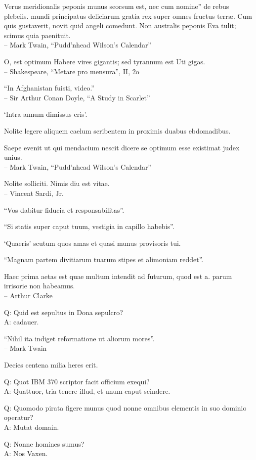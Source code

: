 \documentclass[titlepage,12pt]{memoir}
\begin{document}
Verus meridionalis peponis munus seorsum est, nec cum nomine”
de rebus plebeiis. mundi principatus deliciarum gratia rex
super omnes fructus terræ. Cum quis gustaverit, novit quid
angeli comedunt. Non australis peponis Eva tulit; scimus quia
paenituit.
\\-- Mark Twain, “Pudd’nhead Wilson’s Calendar”

O, est optimum
Habere vires gigantis; sed tyrannum est
Uti gigas.
\\-- Shakespeare, “Metare pro mensura”, II, 2o

 “In Afghanistan fuisti, video.”
\\-- Sir Arthur Conan Doyle, “A Study in Scarlet”

‘Intra annum dimissus eris’.

Nolite legere aliquem caelum scribentem in proximis duabus ebdomadibus.

Saepe evenit ut qui mendacium nescit dicere se optimum esse existimat
judex unius.
\\-- Mark Twain, “Pudd’nhead Wilson’s Calendar”

Nolite solliciti. Nimis diu est vitae.
\\-- Vincent Sardi, Jr.

“Vos dabitur fiducia et responsabilitas”.

“Si statis super caput tuum, vestigia in capillo habebis”.

‘Quaeris’ scutum quos amas et quasi munus provisoris tui.

“Magnam partem divitiarum tuarum stipes et alimoniam reddet”.

Haec prima aetas est quae multum intendit ad futurum, quod est a.
parum irrisorie non habeamus.
\\-- Arthur Clarke

Q: Quid est sepultus in Dona sepulcro?\\
A: cadauer.

“Nihil ita indiget reformatione ut aliorum mores”.
\\-- Mark Twain

Decies centena milia heres erit.

Q: Quot IBM 370 scriptor facit officium exequi?\\
A: Quattuor, tria tenere illud, et unum caput scindere.

Q: Quomodo pirata figere munus quod
nonne omnibus elementis in suo dominio operatur?\\
A: Mutat domain.

Q: Nonne homines sumus?\\
A: Nos Vaxen.
\end{document}

